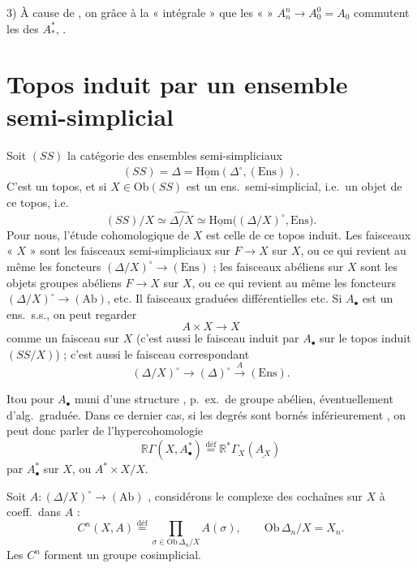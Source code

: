 \documentclass[11pt,a4paper]{article}
\begin{document}
3) À cause de , on  grâce à la  « intégrale »
\ill{}  que les \ill{} «  »
$A_n^{n} \to A_0^{0} = A_0$ commutent \ill{} \ill{} les \ill{}
des $A_*^{*}$, \ill{} \ill{} \ill{}.

\section{Topos induit par un ensemble semi-simplicial}

Soit $(SS)$ la catégorie des ensembles semi-simpliciaux
\[
  (SS) = \widehat{\Delta} = \underline{\mathrm{Hom}}(\Delta^{\circ}, (\mathrm{Ens})) .
\]
C'est un topos, et si $X \in \mathrm{Ob}(SS)$ est un ens.\ semi-simplicial, i.e.\ un objet de ce
topos, i.e.\ 
\[
  (SS)/X \simeq \widehat{\Delta/X} \simeq \underline{\mathrm{Hom}}\bigl((\Delta/X)^{\circ}, \mathrm{Ens}\bigr) .
\]
Pour nous, l'étude cohomologique de $X$ est celle de ce topos induit. Les faisceaux
 \struck{\ill{}}  « $X$ » sont les \struck{\ill{}} faisceaux
semi-simpliciaux sur $F \to X$ sur $X$, ou ce qui revient au même les foncteurs
$(\Delta/X)^{\circ} \to (\mathrm{Ens})$ ; les faisceaux abéliens sur $X$ sont les objets groupes
abéliens $F \to X$ sur $X$, ou ce qui revient au même les foncteurs
$(\Delta/X)^{\circ} \to (\mathrm{Ab})$, etc. Il   
faisceaux  graduées différentielles etc. Si $A_\bullet$ est un ens.\ s.s., on peut
regarder
\[
  A \times X \longrightarrow X
\]
comme un faisceau sur $X$ (c'est aussi le faisceau induit par $A_\bullet$ sur le topos induit
$(SS/X)$) ; c'est aussi le faisceau correspondant
\[
  (\Delta/X)^{\circ} \longrightarrow (\Delta)^{\circ} \xrightarrow{\ A\ } (\mathrm{Ens}) .
\]

Itou pour $A_\bullet$ muni d'une structure , p.~ex.\ de groupe abélien,
éventuellement d'alg.\ graduée. Dans ce dernier cas, si les degrés sont bornés inférieurement
\ill{}, on peut donc parler de l'hypercohomologie
\[
  \mathbb{R}\Gamma(X, A_\bullet^{*}) \overset{\text{déf}}{=} \mathbb{R}^{*}\Gamma_X(\underline{A_X})
\]
 par $A_\bullet^{*}$ sur $X$, ou $A^{*} \times X / X$.

Soit $A : (\Delta/X)^{\circ} \to (\mathrm{Ab})$ , considérons le complexe
des cochaînes sur $X$ à coeff.\ dans $A$ :
\[
  C^{n}(X, A) \overset{\text{déf}}{=} \prod_{\sigma \in \mathrm{Ob}\,\Delta_n/X} A(\sigma),
  \qquad \mathrm{Ob}\,\Delta_n/X = X_n .
\]
Les $C^{n}$ forment un groupe cosimplicial.
\end{document}
